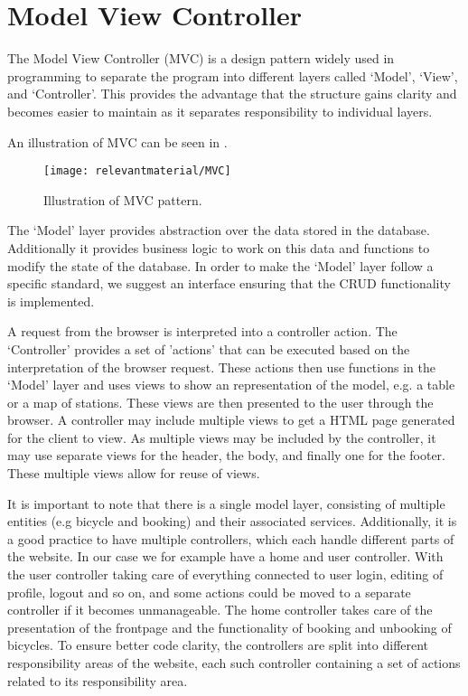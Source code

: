\section{Model View Controller}\label{sec:mvc}
The Model View Controller (MVC) is a design pattern widely used in programming to separate the program into different layers called `Model', `View', and `Controller'.
This provides the advantage that the structure gains clarity and becomes easier to maintain as it separates responsibility to individual layers.

An illustration of MVC can be seen in .
\begin{figure}[h]
	\centering
	\texttt{[image: relevantmaterial/MVC]}
	\caption{Illustration of MVC pattern.}\label{fig:MVC}
\end{figure}

The `Model' layer provides abstraction over the data stored in the database.
Additionally it provides business logic to work on this data and functions to modify the state of the database.
In order to make the `Model' layer follow a specific standard, we suggest an interface ensuring that the CRUD functionality is implemented.

A request from the browser is interpreted into a controller action.
The `Controller' provides a set of 'actions' that can be executed based on the interpretation of the browser request. 
These actions then use functions in the `Model' layer and uses views to show an representation of the model, e.g. a table or a map of stations. 
These views are then presented to the user through the browser.
A controller may include multiple views to get a HTML page generated for the client to view.
As multiple views may be included by the controller, it may use separate views for the header, the body, and finally one for the footer. 
These multiple views allow for reuse of views.

It is important to note that there is a single model layer, consisting of multiple entities (e.g bicycle and booking) and their associated services.
Additionally, it is a good practice to have multiple controllers, which each handle different parts of the website.
In our case we for example have a home and user controller.
With the user controller taking care of everything connected to user login, editing of profile, logout and so on, and some actions could be moved to a separate controller if it becomes unmanageable.
The home controller takes care of the presentation of the frontpage and the functionality of booking and unbooking of bicycles.
To ensure better code clarity, the controllers are split into different responsibility areas of the website, each such controller containing a set of actions related to its responsibility area.

